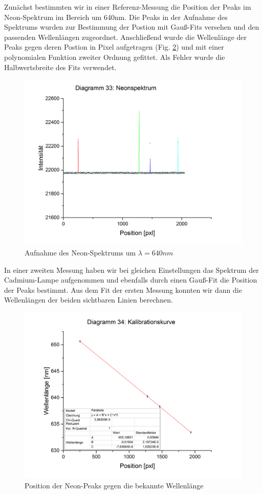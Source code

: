 Zunächst bestimmten wir in einer Referenz-Messung die Position der Peaks im Neon-Spektrum im Bereich um 640nm. Die Peaks in der Aufnahme des Spektrums wurden zur Bestimmung der Postion mit Gauß-Fits versehen und den passenden Wellenlängen zugeordnet.
Anschließend wurde die Wellenlänge der Peaks gegen deren Postion in Pixel aufgetragen (Fig. \ref{fig:PositionPeaks}) und mit einer polynomialen Funktion zweiter Ordnung gefittet. Als Fehler wurde die Halbwertsbreite des Fits verwendet.
\begin{figure}
  \includegraphics[width=\linewidth]{images/Neonspektrum.png}
  \caption{Aufnahme des Neon-Spektrums um $\lambda = 640 nm$}
  \label{fig:Neonspektrum}
\end{figure}

In einer zweiten Messung haben wir bei gleichen Einstellungen das Spektrum der Cadmium-Lampe aufgenommen und ebenfalls durch einen Gauß-Fit die Position der Peaks bestimmt. Aus dem Fit der ersten Messung konnten wir dann die Wellenlängen der beiden sichtbaren Linien berechnen.
\begin{figure}
  \includegraphics[width=\linewidth]{images/Kalibrationskurve.jpg}
  \caption{Position der Neon-Peaks gegen die bekannte Wellenlänge}
  \label{fig:PositionPeaks}
\end{figure}

